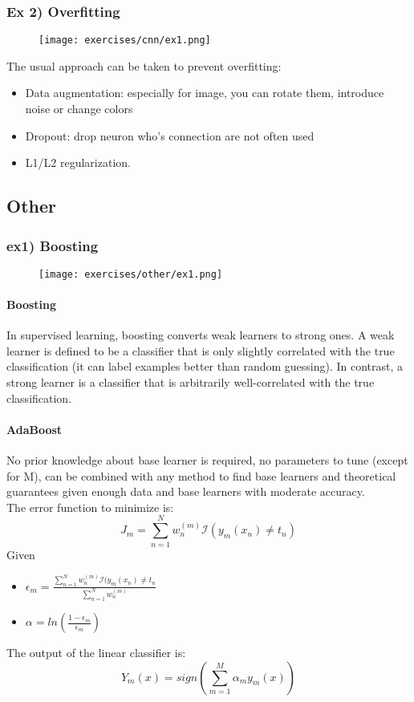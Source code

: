 \subsubsection{Ex 2) Overfitting}
\begin{figure}[H]
    \centering
    \texttt{[image: exercises/cnn/ex1.png]}
\end{figure}

The usual approach can be taken to prevent overfitting:
\begin{itemize}
\item Data augmentation: especially for image, you can rotate them, introduce noise or change colors
\item Dropout: drop neuron who's connection are not often used
\item L1/L2 regularization.
\end{itemize}


\subsection{Other}


\subsubsection{ex1) Boosting}

\begin{figure}[H]
    \centering
    \texttt{[image: exercises/other/ex1.png]}
\end{figure}

\paragraph{Boosting}
In supervised learning, boosting converts weak learners to strong ones. A weak learner is defined to be a classifier that is only slightly correlated with the true classification (it can label examples better than random guessing). In contrast, a strong learner is a classifier that is arbitrarily well-correlated with the true classification.

\paragraph{AdaBoost}
No prior knowledge about base learner is required, no parameters to tune (except for M), can be combined with any method to find base learners and theoretical guarantees given enough data and base learners with moderate accuracy.\\
The error function to minimize is:
\[J_m=\sum_{n=1}^N w_n^{(m)}\mathcal{I}(y_m(x_n)\neq t_n)\]
Given 
\begin{itemize}
\item $\epsilon_m = \frac{\sum_{n=1}^N w_n^{(m)}\mathcal{I}(y_m(x_n)\neq t_n}{\sum_{n=1}^N w_n^{(m)}}$
\item $\alpha=ln(\frac{1-\epsilon_m}{\epsilon_m})$
\end{itemize}
The output of the linear classifier is:
\[Y_m(x)=sign(\sum_{m=1}^M\alpha_my_m(x))\]



